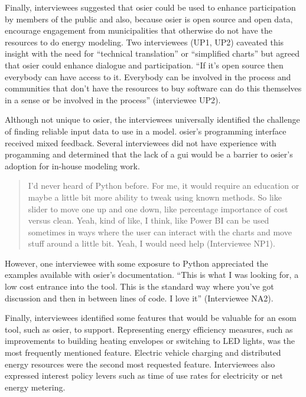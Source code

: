 Finally, interviewees suggested that \ac{osier} could be used to enhance
participation by members of the public and also, because \ac{osier} is open
source and open data, encourage engagement from municipalities that otherwise do
not have the resources to do energy modeling. Two interviewees (UP1, UP2)
caveated this insight with the need for ``technical translation'' or
``simplified charts'' but agreed that \ac{osier} could enhance dialogue and
participation. ``If it's open source then everybody can have access to it.
Everybody can be involved in the process and communities that don't have the
resources to buy software can do this themselves in a sense or be involved in
the process'' (interviewee UP2). 

Although not unique to \ac{osier}, the interviewees universally identified the
challenge of finding reliable input data to use in a model. \ac{osier}'s
programming interface received mixed feedback. Several interviewees did not have
experience with progamming and determined that the lack of a \ac{gui} would be a
barrier to \ac{osier}'s adoption for in-house modeling work. 
\begin{quote}
    I'd never heard of Python before. For me, it would require an education or
    maybe a little bit more ability to tweak using known methods. So like slider
    to move one up and one down, like percentage importance of cost versus
    clean. Yeah, kind of like, I think, like Power BI can be used sometimes in
    ways where the user can interact with the charts and move stuff around a
    little bit. Yeah, I would need help (Interviewee NP1).
\end{quote}
However, one interviewee with some exposure to Python appreciated the examples
available with \ac{osier}'s documentation. ``This is what I was looking for, a
low cost entrance into the tool. This is the standard way where you've got
discussion and then in between lines of code. I love it'' (Interviewee NA2).

Finally, interviewees identified some features that would be valuable for an
\ac{esom} tool, such as \ac{osier}, to support. Representing energy efficiency
measures, such as improvements to building heating envelopes or switching to LED
lights, was the most frequently mentioned feature. Electric vehicle charging and
distributed energy resources were the second most requested feature.
Interviewees also expressed interest  policy levers such as time of use rates
for electricity or net energy metering.


